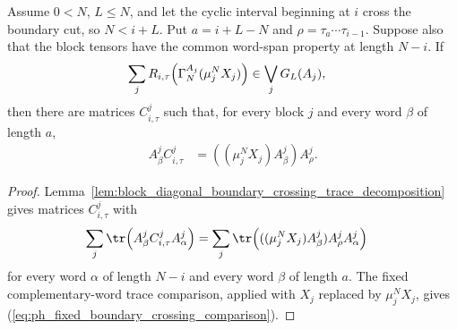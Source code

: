 \begin{lemma}
    \label{thm:block_diagonal_boundary_crossing_pgvwc_comparison}
    \leanok
    Assume $0<N$, $L\le N$, and let the cyclic interval beginning at $i$
    cross the boundary cut, so $N<i+L$. Put $a=i+L-N$ and
    $\rho=\tau_a\cdots\tau_{i-1}$. Suppose also that the block tensors have
    the common word-span property at length $N-i$. If
    \begin{align}
        \sum_j
        R_{i,\tau}\!\left(\Gamma_N^{A_j}(\mu_j^NX_j)\right)
         & \in\bigvee_jG_L(A_j),
        \notag
    \end{align}
    then there are matrices $C^j_{i,\tau}$ such that, for every block $j$
    and every word $\beta$ of length $a$,
    \begin{align}
        A^j_\beta C^j_{i,\tau}
         & =
        ((\mu_j^NX_j)A^j_\beta)A^j_\rho.
        \label{eq:ph_fixed_boundary_crossing_comparison}
    \end{align}
\end{lemma}

\begin{proof}
    \leanok
    Lemma~\ref{lem:block_diagonal_boundary_crossing_trace_decomposition}
    gives matrices $C^j_{i,\tau}$ with
    \begin{align}
        \sum_j\tr\!\left(A^j_\beta C^j_{i,\tau}A^j_\alpha\right)
         & =
        \sum_j\tr\!\left(((\mu_j^NX_j)A^j_\beta)A^j_\rho A^j_\alpha\right)
        \notag
    \end{align}
    for every word $\alpha$ of length $N-i$ and every word $\beta$ of length
    $a$. The fixed complementary-word trace comparison, applied with
    $X_j$ replaced by $\mu_j^NX_j$, gives
    (\ref{eq:ph_fixed_boundary_crossing_comparison}).
\end{proof}

